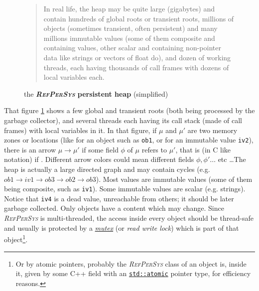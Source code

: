 \documentclass[11pt,a4paper,svgnames]{article}
\newcommand{\RefPerSys}{{\textit{\textsc{RefPerSys}}}}
\begin{document}
\begin{figure}[H]
\begin{quote}
\begin{relsize}{-0.2}
    In real life, the heap may be quite large (gigabytes) and contain
    hundreds of global roots or transient roots, millions of objects
    (sometimes transient, often persistent) and many millions
    immutable values (some of them composite and containing values,
    other scalar and containing non-pointer data like strings or
    vectors of float do), and dozen of working threads, each having
    thousands of call frames with dozens of local variables each.
   \end{relsize}
\end{quote}
  
  \caption{the  \textbf{{\RefPerSys} persistent heap}  (simplified)}
  \label{fig:persistent-heap}
\end{figure}

That figure \ref{fig:persistent-heap} shows a few global and transient
roots (both being processed by the garbage collector), and several
threads each having its call stack (made of call frames) with local
variables in it. In that figure, if $\mu$ and $\mu'$ are two memory
zones or locations (like for an object such as \texttt{ob1}, or for an
immutable value \texttt{iv2}), there is an arrow $\mu \rightarrow
\mu'$ if some field $\phi$ of $\mu$ refers to $\mu'$, that is (in C
like notation) if . Different
arrow colors could mean different fields $\phi, \phi' \ldots$ etc
\ldots The heap is actually a large directed graph and may contain
cycles (e.g. $ ob1 \rightarrow iv1 \rightarrow ob3 \rightarrow ob2
\rightarrow ob3 $). Most values are immutable values (some of them
being composite, such as \texttt{iv1}). Some immutable values are
scalar (e.g. strings). Notice that \texttt{iv4} is a dead value,
unreachable from others; it should be later garbage collected.  Only
objects have a content which may change. Since {\RefPerSys} is
multi-threaded, the access inside every object should be thread-safe
and usually is protected by a
\href{https://en.wikipedia.org/wiki/Lock\_(computer\_science)}{\textit{mutex}}
(or \textit{read write lock}) which is part of that object\footnote{Or
by atomic pointers, probably the {\RefPerSys} class of an object is,
inside it, given by some C++ field with an
\href{https://en.cppreference.com/w/cpp/atomic/atomic}{\texttt{std::atomic}}
pointer type, for efficiency reasons.}.
\end{document}
